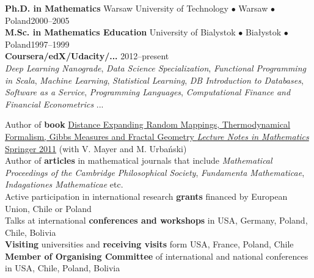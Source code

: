 \documentclass[a4paper, oneside]{scrreprt}
\begin{document}
\noindent\makebox[\linewidth]{\rule{\textwidth}{0.4pt}}

\vspace{0.6cm}

  
\noindent\textbf{Ph.D. in Mathematics} Warsaw University of Technology $\bullet$ Warsaw $\bullet$ Poland\hfill 2000--2005\\
\noindent\textbf{M.Sc. in Mathematics Education} University of Bialystok $\bullet$ Białystok $\bullet$ Poland\hfill 1997--1999\\
\noindent\textbf{Coursera/edX/Udacity/...} \hfill 2012--present\\
\emph{Deep Learning Nanograde}, \emph{Data Science Specialization}, \emph{Functional Programming in Scala}, 
\emph{Machine Learning},  \emph{Statistical Learning}, 
\emph{DB Introduction to Databases}, \emph{Software as a Service}, 
\emph{Programming Languages}, 
\emph{Computational Finance and Financial Econometrics} ... \\

\noindent\makebox[\linewidth]{\rule{\textwidth}{0.4pt}}

\vspace{0.6cm}


\noindent\llap{\FA \faBook\ \ }Author of \textbf{book} \href{http://www.amazon.com/Distance-Expanding-Thermodynamical-Formalism-Mathematics/dp/3642236499/ref=sr_1_1?s=books&ie=UTF8&qid=1410309067&sr=1-1}{Distance Expanding Random Mappings, Thermodynamical Formalism, Gibbs Measures and Fractal Geometry \textit{Lecture Notes in Mathematics} Springer 2011} (with V. Mayer and M. Urbański)\\
\noindent\llap{\FA \faPencil\ \ }Author of \textbf{articles} in 
mathematical journals that include  
\textit{Mathematical Proceedings of the Cambridge Philosophical Society}, \textit{Fundamenta Mathematicae}, \textit{Indagationes Mathematicae} etc.\\
\noindent\llap{\FA \faFlask\ \ }Active participation in international research \textbf{grants} financed by European Union, Chile or Poland\\
\noindent\llap{\FA \faBullhorn\ \ }Talks at international 
\textbf{conferences and workshops} in USA, Germany, Poland, 
Chile, Bolivia\\
\noindent\llap{\FA \faExchange\ \ }\textbf{Visiting} 
universities and \textbf{receiving visits} form USA, France, Poland, Chile\\
\noindent\llap{\FA \faCalendar\ \ }\textbf{Member of Organising Committee}
of international and national conferences in USA, Chile, Poland, Bolivia
\end{document}
